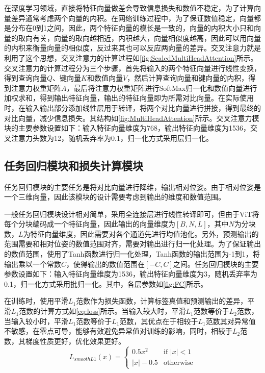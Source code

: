 \documentclass{Diploma}
\begin{document}
在深度学习领域，直接将特征向量做差会导致信息损失和数值不稳定，为了计算向量差异通常考虑两个向量的内积。在网络训练过程中，为了保证数值稳定，向量都是分布在0到1之间，因此，两个特征向量的模长是一致的，向量的内积大小只和向量的取向有关，向量的取向越相近，内积越大，向量相似度越高，因此可以用向量的内积来衡量向量的相似度，反过来其也可以反应两向量的差异。交叉注意力就是利用了这个思想，交叉注意力的计算过程如\ref{fig:ScaledMultiHeadAttention}所示。交叉注意力的计算过程分为三个步骤，首先将输入的两个特征向量进行线性变换，得到查询向量$Q$、键向量$K$和数值向量$V$，然后计算查询向量和键向量的内积，得到注意力权重矩阵$A$，最后将注意力权重矩阵进行SoftMax归一化和数值向量进行加权求和，得到输出特征向量，输出的特征向量即为所需对比向量。在实际使用时，在输入输出部分添加线性层用于转译，将两个对比向量进行拼接，得到最终的对比向量，减少信息损失。其结构如\ref{fig:MultiHeadAttention}所示。交叉注意力模块的主要参数设置如下：输入特征向量维度为768，输出特征向量维度为1536，交叉注意力头数为12，随机丢弃率为0.1，归一化方式采用层归一化。

\subsection{任务回归模块和损失计算模块}
任务回归模块的主要任务是将对比向量进行降维，输出相对位姿。由于相对位姿是一个三维向量，因此该模块的设计需要考虑到输出的维度和数值范围。

%

一般任务回归模块设计相对简单，采用全连接层进行线性转译即可，但由于ViT将每个分块编码成一个特征向量，因此输出的向量维度为$[B,N,L]$，其中$N$为分块数，$L$为特征向量维度，因此需要对各个通道先进行均值池化。另外，预测输出的范围需要和相对位姿的数值范围对齐，需要对输出进行归一化处理。为了保证输出的数值范围，使用了Tanh函数进行归一化处理，Tanh函数的输出范围为-1到1，将输出乘以一个常数$C$，使得输出的数值范围在$[-C,C]$之间。任务回归模块的主要参数设置如下：输入特征向量维度为1536，输出特征向量维度为3，随机丢弃率为0.1，归一化方式采用批归一化。其中，各层参数如\ref{fig:FC}所示。

在训练时，使用平滑$L_{1}$范数作为损失函数，计算标签真值和预测输出的差异，平滑$L_{1}$范数的计算方式如\eqref{eq:loss}所示。当输入较大时，平滑$L_{1}$范数等价于$L_2$范数，当输入较小时，平滑$L_{1}$范数等价于$L_{1}$范数，其优点在于相较于$L_1$范数其对异常值不敏感，在零点可导，能够有效避免异常值对训练的影响，同时，相较于$L_2$范数，其梯度性质更好，优化效果更好。
\begin{equation} \label{eq:loss}
  L_{smoothL1}(x) = \begin{cases}
    0.5x^2 & \text{if } |x| < 1 \\
    |x| - 0.5 & \text{otherwise}
  \end{cases}
\end{equation}
\end{document}
